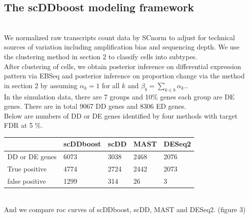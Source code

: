 \documentclass[11pt]{amsart}
\begin{document}
\subsection{The scDDboost modeling framework}\hfill\\
We normalized raw transcripts count data by SCnorm\cite{ref:Rhonda} to adjust for technical sources of variation including amplification bias and sequencing depth. We use the clustering method in section 2 to classify cells into subtypes.\\
After clustering of cells, we obtain posterior inference on differential expression pattern via EBSeq\cite{ref:Leng} and posterior inference on proportion change via the method in section 2 by assuming $\alpha_k=1$ for all $k$ and $\beta_b = \sum_{k\in b}\alpha_k.$. \\
In the simulation data, there are 7 groups and 10\% genes each group are DE genes. There are in total 9067 DD genes and 8306 ED genes.\\
Below are numbers of DD or DE genes identified by four methods with target FDR at 5 \%. \\
\begin{tabular}{ |p{3cm}|p{3cm}|p{3cm}|p{3cm}|p{3cm}|}
\hline
 & scDDboost & scDD & MAST & DESeq2\\
\hline
\hline
DD or DE genes & 6073 & 3038 & 2468 & 2076\\
\hline
True positive & 4774 & 2724 & 2442 & 2073\\
\hline
false positive & 1299 & 314 & 26 & 3\\
\hline
\end{tabular}\\
And we compare roc curves of scDDboost, scDD, MAST and DESeq2. (figure 3)
\end{document}
